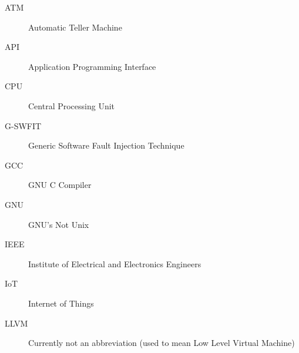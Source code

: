 \begin{description}
\item[ATM] Automatic Teller Machine
\item[API] Application Programming Interface
\item[CPU] Central Processing Unit
\item[G-SWFIT] Generic Software Fault Injection Technique
\item[GCC] GNU C Compiler
\item[GNU] GNU's Not Unix 
\item[IEEE] Institute of Electrical and Electronics Engineers
\item[IoT] Internet of Things
    \item[LLVM] Currently not an abbreviation (used to mean  Low Level Virtual Machine)
\end{description}